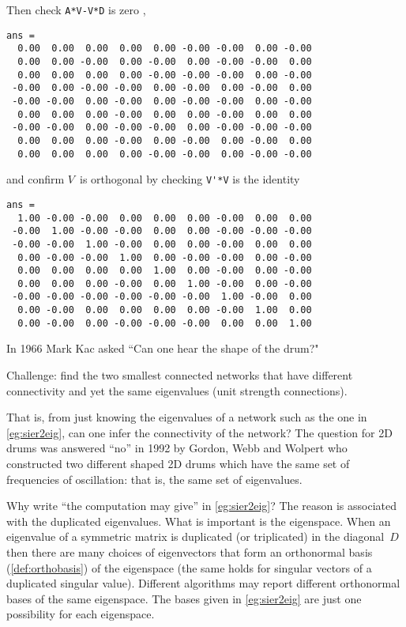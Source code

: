 \begin{example}
\begin{solution}
\begin{itemize}
\end{itemize}
Then check \verb|A*V-V*D| is zero \twodp,
{\small%
\begin{verbatim}
ans =
  0.00  0.00  0.00  0.00  0.00 -0.00 -0.00  0.00 -0.00
  0.00  0.00 -0.00  0.00 -0.00  0.00 -0.00 -0.00  0.00
  0.00  0.00  0.00  0.00 -0.00 -0.00 -0.00  0.00 -0.00
 -0.00  0.00 -0.00 -0.00  0.00 -0.00  0.00 -0.00  0.00
 -0.00 -0.00  0.00 -0.00  0.00 -0.00 -0.00  0.00 -0.00
  0.00  0.00  0.00 -0.00  0.00  0.00 -0.00  0.00  0.00
 -0.00 -0.00  0.00 -0.00 -0.00  0.00 -0.00 -0.00 -0.00
  0.00  0.00  0.00 -0.00  0.00 -0.00  0.00 -0.00  0.00
  0.00  0.00  0.00  0.00 -0.00 -0.00  0.00 -0.00 -0.00
\end{verbatim}
}
and confirm \(V\)~is orthogonal by checking \verb|V'*V| is the identity \twodp
{\small%
\begin{verbatim}
ans =
  1.00 -0.00 -0.00  0.00  0.00  0.00 -0.00  0.00  0.00
 -0.00  1.00 -0.00 -0.00  0.00  0.00 -0.00 -0.00 -0.00
 -0.00 -0.00  1.00 -0.00  0.00  0.00 -0.00  0.00  0.00
  0.00 -0.00 -0.00  1.00  0.00 -0.00 -0.00  0.00 -0.00
  0.00  0.00  0.00  0.00  1.00  0.00 -0.00  0.00 -0.00
  0.00  0.00  0.00 -0.00  0.00  1.00 -0.00  0.00 -0.00
 -0.00 -0.00 -0.00 -0.00 -0.00 -0.00  1.00 -0.00  0.00
  0.00 -0.00  0.00  0.00  0.00  0.00 -0.00  1.00  0.00
  0.00 -0.00  0.00 -0.00 -0.00 -0.00  0.00  0.00  1.00
\end{verbatim}
}
\end{solution}
\end{example}



In 1966 Mark Kac asked ``Can one hear the shape of the drum?"
\begin{aside}
Challenge: find the two smallest connected networks that have different connectivity and yet the same eigenvalues (unit strength connections).
\end{aside}%
That is, from just knowing the eigenvalues of a network such as the one in \autoref{eg:sier2eig}, can one infer the connectivity of the network?
The question for 2D drums was answered ``no'' in 1992 by Gordon, Webb and Wolpert who constructed two different shaped 2D drums which have the same set of frequencies of oscillation: that is, the same set of eigenvalues.

Why write ``the computation may give'' in \autoref{eg:sier2eig}?  
The reason is associated with the duplicated eigenvalues.
What is important is the eigenspace.
When an eigenvalue of a symmetric matrix is duplicated (or triplicated) in the diagonal~\(D\) then there are many choices of eigenvectors that form an orthonormal basis (\autoref{def:orthobasis}) of the eigenspace (the same holds for singular vectors of a duplicated singular value).
Different algorithms may report different orthonormal bases of the same eigenspace.
The bases given in  \autoref{eg:sier2eig} are just one possibility for each eigenspace.




